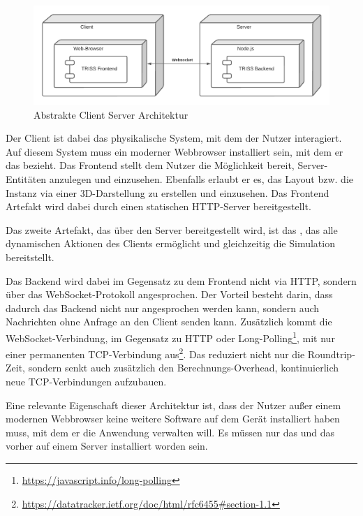 \begin{figure}[htb]
    \centering
    \includegraphics[scale=.65,center]{medien/client-server-start.pdf}
    \caption{Abstrakte Client Server Architektur}
    \ownsource
    \label{fig:abstract-client-server}
\end{figure}

\FloatBarrier

Der Client ist dabei das physikalische System, mit dem der Nutzer interagiert.
Auf diesem System muss ein moderner Webbrowser installiert sein, mit dem er das  bezieht.
Das Frontend stellt dem Nutzer die Möglichkeit bereit, Server-Entitäten anzulegen und einzusehen.
Ebenfalls erlaubt er es, das Layout bzw. die Instanz via einer 3D-Darstellung zu erstellen und einzusehen.
Das Frontend Artefakt wird dabei durch einen statischen HTTP-Server bereitgestellt.

Das zweite Artefakt, das über den Server bereitgestellt wird, ist das , das alle dynamischen Aktionen des Clients ermöglicht und gleichzeitig die Simulation bereitstellt.

Das Backend wird dabei im Gegensatz zu dem Frontend nicht via HTTP, sondern über das WebSocket-Protokoll angesprochen.
Der Vorteil besteht darin, dass dadurch das Backend nicht nur angesprochen werden kann, sondern auch Nachrichten ohne Anfrage an den Client senden kann.
Zusätzlich kommt die WebSocket-Verbindung, im Gegensatz zu HTTP oder Long-Polling\footnote{\url{https://javascript.info/long-polling}}, mit nur einer permanenten TCP-Verbindung aus\footnote{\url{https://datatracker.ietf.org/doc/html/rfc6455\#section-1.1}}.
Das reduziert nicht nur die Roundtrip-Zeit, sondern senkt auch zusätzlich den Berechnungs-Overhead, kontinuierlich neue TCP-Verbindungen aufzubauen.

Eine relevante Eigenschaft dieser Architektur ist, dass der Nutzer außer einem modernen Webbrowser keine weitere Software auf dem Gerät installiert haben muss, mit dem er die Anwendung verwalten will.
Es müssen nur das  und das  vorher auf einem Server installiert worden sein.

